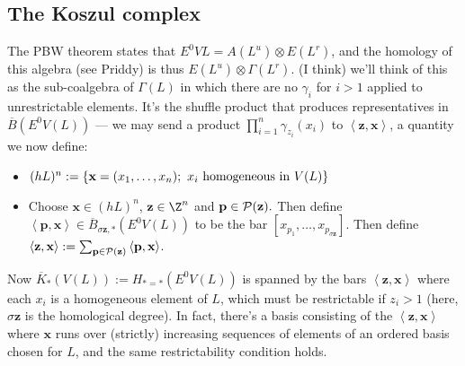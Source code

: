 \documentclass[11pt]{article}
\begin{document}
\begin{PRlieKoszulComplexCalculation}
\subsection*{The Koszul complex}
The PBW theorem states that $E^0VL=A(L^u)\otimes E(L^r)$, and the homology of this algebra (see Priddy) is thus $E(L^u)\otimes \Gamma(L^r)$. (I think) we'll think of this as the sub-coalgebra of $\Gamma(L)$ in which there are no $\gamma_i$ for $i>1$ applied to unrestrictable elements. It's the shuffle product that produces representatives in $\overline{B}(E^0V(L))$ --- we may send a product $\prod_{i=1}^{n}\gamma_{z_i}(x_i)$ to $\left\langle \textbf{z},\textbf{x}\right\rangle$, a quantity we now define:

\begin{itemize}
\setlength{\parindent}{.25in}
\item $(hL)^n:=\{\textbf{x}=(x_1,\ldots,x_n);\ x_i\textup{ homogeneous in }V(L)\}$
\item Choose $\textbf{x}\in(hL)^n$, $\textbf{z}\in\Z^n$ and $\textbf{p}\in\mathcal{P}(\textbf{z}).$ Then define $\left\langle \textbf{p},\textbf{x}\right\rangle\in\overline{B}_{\sigma\textbf{z},*}(E^0V(L))$ to be the bar $[x_{p_1},\ldots,x_{p_{\sigma\textbf{z}}}]$. Then define $\left\langle \textbf{z},\textbf{x}\right\rangle:= \sum_{\textbf{p}\in\mathcal{P}(\textbf{z})}\left\langle \textbf{p},\textbf{x}\right\rangle$. 
\end{itemize}
Now $\overline{K}_*(V(L)):=H_{*=*}(E^0V(L))$ is spanned by the bars $\left\langle \textbf{z},\textbf{x}\right\rangle$ where each $x_i$ is a homogeneous element of $L$, which must be restrictable if $z_i>1$ (here, $\sigma\textbf{z}$ is the homological degree). In fact, there's a basis consisting of the $\left\langle \textbf{z},\textbf{x}\right\rangle$ where $\textbf{x}$ runs over (strictly) increasing sequences of elements of an ordered basis chosen for $L$, and the same restrictability condition holds.


\end{PRlieKoszulComplexCalculation}
\end{document}
